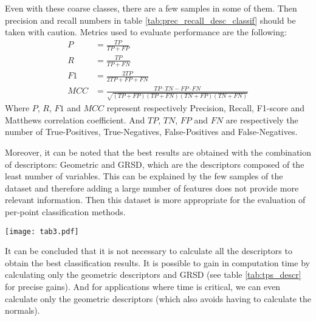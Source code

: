 \documentclass[a4paper, 10pt, journal]{article}
\begin{document}
Even with these coarse classes, there are a few samples in some of them. Then precision and recall numbers in table \ref{tab:prec_recall_desc_classif} should be taken with caution. Metrics used to evaluate performance are the following:
\begin{align} \label{equ:indicators}
 P   &= \frac{TP}{TP + FP}\nonumber \\
 R   &= \frac{TP}{TP + FN} \\
 F1  &= \frac{2TP}{2TP + FP + FN}\nonumber \\
 MCC &= \frac{TP\cdot TN - FP\cdot FN}{\sqrt{(TP + FP)(TP + FN)(TN + FP)(TN + FN)}}\nonumber
\end{align}
Where $P$, $R$, $F1$ and $MCC$ represent respectively Precision, Recall, F1-score and Matthews correlation coefficient. And $TP$, $TN$, $FP$ and $FN$ are respectively the number of True-Positives, True-Negatives, False-Positives and False-Negatives.

 Moreover, it can be noted that the best results are obtained with the combination of descriptors: Geometric and GRSD, which are the descriptors composed of the least number of variables. 
This can be explained by the few samples of the dataset and therefore adding a large number of features does not provide more relevant information.
Then this dataset is more appropriate for the evaluation of per-point classification methods.
  
\begin{center}
 \texttt{[image: tab3.pdf]}
\end{center}

It can be concluded that it is not necessary to calculate all the descriptors to obtain the best classification results. It is possible to gain in computation time by calculating only the geometric descriptors and GRSD (see table \ref{tab:tps_descr} for precise gains). And for applications where time is critical, we can even calculate only the geometric descriptors (which also avoids having to calculate the normals).
\end{document}
